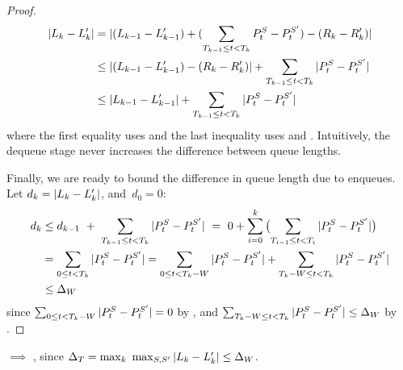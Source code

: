 {\begin{proof}
\begin{align*}
\nonumber
|L_{k} - L_{k}'| & =  |(L_{k-1} - L_{k-1}')
+
(\sum_{T_{k-1} \leq t < T_{k}}P^S_t - P^{S'}_t) - ({R}_{k} -
{R}_{k}') |
\\
& \leq
|(L_{k-1} - L_{k-1}') - ({R}_{k} - {R}_{k}')|
+
\sum_{T_{k-1} \leq t < T_{k}}|P^S_t - P^{S'}_t|
\\
& \leq
|L_{k-1} - L_{k-1}'|
+
\sum_{T_{k-1} \leq t < T_{k}}|P^S_t - P^{S'}_t|
\end{align*}
where the first equality uses  and the last
inequality uses  and .
Intuitively, the dequeue stage never increases the difference between queue
lengths.

Finally, we are ready to bound the difference in queue length due to enqueues.
%
Let $d_k = |L_{k}-L_{k}'|$, and~$d_0 = 0$:
\begin{align}
\nonumber
  d_k &\leq d_{k-1}~+~\sum_{T_{k-1} \leq t < T_{k}}|P^S_t - P^{S'}_t|~=~
\nonumber
0 + \sum_{i=0}^{k}\big({\sum_{T_{i-1} \leq t < T_{i}}|P^S_t - P^{S'}_t|}\big)\\
&=
\nonumber
\sum_{0 \leq t < T_{k}} |P^S_t - P^{S'}_t| =
\nonumber
\sum_{0 \leq t < T_k - W} |P^S_t - P^{S'}_t| +
\sum_{T_{k} - W \leq t < T_{k}} |P^S_t - P^{S'}_t|\\
\nonumber
&\leq \Delta_{W}
\end{align}
since $\sum_{0 \leq t < T_k - W} |P^S_t - P^{S'}_t| = 0$ by ,
and $\sum_{T_{k} - W \leq t < T_{k}} |P^S_t - P^{S'}_t| \leq \Delta_{W}$ by .
\end{proof}
\vspace{-0.1cm}
 $\implies$ , since
$\Delta_T = \max_{k}~\max_{S, S'} | L_{k} - L_{k}' | \leq
\Delta_{W}$.
}






